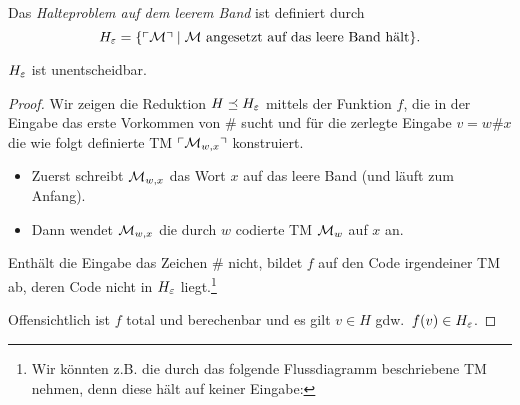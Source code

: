 \begin{Def}[name={[Halteproblem auf leerem Band $H_\Eps$]}]
	Das \emph{Halteproblem auf dem leerem Band} ist definiert durch
	\[H_\varepsilon = \{\ulcorner \mathcal{M} \urcorner \mid \mathcal{M} \text{ angesetzt auf das leere Band hält}\}. \qedhere\]
\end{Def}
\begin{Satz}[name={[$H_\Eps$ ist unentscheidbar]}]
\label{satz:HalteproblemLeeresBand}
	$H_\Eps$ ist unentscheidbar.
\end{Satz}
\begin{proof}
  Wir zeigen die Reduktion $H \preceq H_\varepsilon$ mittels der Funktion $f$, 
  die in der Eingabe das erste Vorkommen von $\#$ sucht und
  für die zerlegte Eingabe $v = w\#x$ die wie folgt definierte \ac{TM} $\ulcorner \mathcal{M}_{w,x} \urcorner$ konstruiert.
  \begin{itemize}
  \item Zuerst schreibt $\mathcal{M}_{w,x}$ das Wort $x$ auf das leere Band (und läuft zum Anfang).
  \item Dann wendet $\mathcal{M}_{w,x}$ die durch $w$ codierte \ac{TM} $\mathcal{M}_w$ auf $x$ an.
  \end{itemize}
  Enthält die Eingabe das Zeichen $\#$ nicht, 
  bildet $f$ auf den Code irgendeiner TM ab, 
  deren Code nicht in $H_\Eps$ liegt.\footnote{
  Wir könnten z.B. die durch das folgende Flussdiagramm beschriebene TM nehmen, denn diese hält auf keiner Eingabe:
  }
  
  Offensichtlich ist $f$ total und berechenbar und es gilt $v\in H$ gdw.\ $f(v) \in H_\varepsilon$.
\end{proof}

